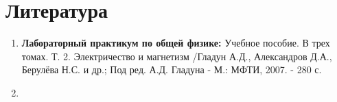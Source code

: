 \documentclass[a4paper,14pt]{article} %
\begin{document}
\section{Литература}

\begin{enumerate}

\item \textbf{Лабораторный практикум по общей физике:} Учебное пособие. В трех томах. Т. 2. Электричество и магнетизм /Гладун А.Д., Александров Д.А., Берулёва Н.С. и др.; Под ред. А.Д. Гладуна - М.: МФТИ, 2007. - 280 с.

\item {}

\end{enumerate}		
		
\end{document}
